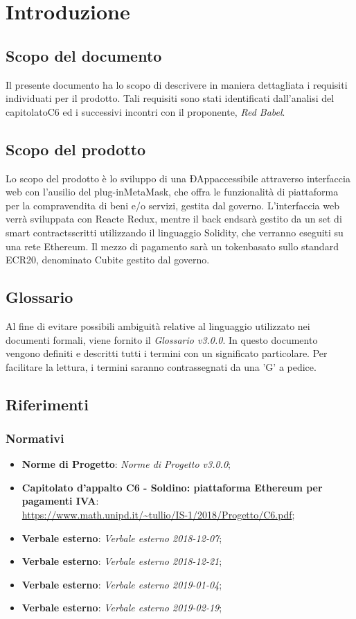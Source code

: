 \section{Introduzione} 
\subsection{Scopo del documento}
Il presente documento ha lo scopo di descrivere in maniera dettagliata i requisiti individuati per il prodotto. Tali requisiti sono stati identificati dall'analisi del capitolato\glosp C6 ed i successivi incontri con il proponente, \textit{Red Babel}.
\subsection{Scopo del prodotto}
Lo scopo del prodotto è lo sviluppo di una ÐApp\glosp accessibile attraverso interfaccia web con l'ausilio del plug-in\glosp MetaMask\glo, che offra le funzionalità di piattaforma per la compravendita di beni e/o servizi, gestita dal governo\glo. L'interfaccia web verrà sviluppata con React\glosp e Redux\glo, mentre il back end\glosp sarà gestito da un set di smart contracts\glosp scritti utilizzando il linguaggio Solidity\glo, che verranno eseguiti su una rete Ethereum\glo.  Il mezzo di pagamento sarà un token\glosp basato sullo standard ECR20\glo, denominato Cubit\glosp e gestito dal governo\glo.

\subsection{Glossario}
Al fine di evitare possibili ambiguità relative al linguaggio utilizzato nei 
documenti formali, viene fornito il \textit{Glossario v3.0.0}. In questo 
documento vengono definiti e descritti tutti i termini con un significato 
particolare. Per facilitare la lettura, i termini saranno contrassegnati da una 
'G' a pedice.
\subsection{Riferimenti}
\subsubsection{Normativi}
\begin{itemize}
	\item \textbf{Norme di Progetto}: \textit{Norme di Progetto v3.0.0};

	\item \textbf{Capitolato d'appalto C6 - Soldino: piattaforma Ethereum per pagamenti IVA}: \\ \url{ https://www.math.unipd.it/~tullio/IS-1/2018/Progetto/C6.pdf};
	\item \textbf{Verbale esterno}: \textit{Verbale esterno 2018-12-07};
	\item \textbf{Verbale esterno}: \textit{Verbale esterno 2018-12-21};
	\item \textbf{Verbale esterno}: \textit{Verbale esterno 2019-01-04};
	\item \textbf{Verbale esterno}: \textit{Verbale esterno 2019-02-19};
	
\end{itemize}
